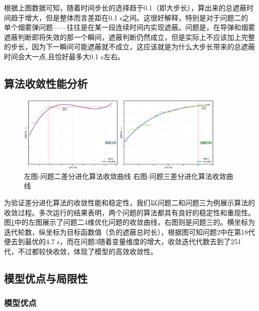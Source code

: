 \documentclass[fontset=SimSun]{ctexart}
\begin{document}
根据上图数据可知，随着时间步长的选择趋于0.1（即大步长），算出来的总遮蔽时间趋于增大，但是整体而言差距在0.1 s之间。这很好解释，特别是对于问题二的单个烟雾弹问题——往往是在某一段连续时间内实现遮蔽。问题是，在导弹和烟雾遮蔽判断即将失效的那一个瞬间，遮蔽判断仍然成立，但是实际上不应该加上完整的步长，因为下一瞬间可能遮蔽就不成立，这应该就是为什么大步长带来的总遮蔽时间会大一点,且恰好最多大0.1 s左右。

\subsection{算法收敛性能分析}

\begin{figure}[H]
    \centering
    \includegraphics[width=0.9\textwidth]{11.问题2和3的迭代收敛曲线.png}
    \caption{左图-问题二差分进化算法收敛曲线  右图-问题三差分进化算法收敛曲线}
    \label{fig:convergence_p2}
\end{figure}

为验证差分进化算法的收敛性能和稳定性，我们以问题二和问题三为例展示算法的收敛过程。多次运行的结果表明，两个问题的算法都具有良好的稳定性和重现性。图\ref{fig:convergence_p2}中的左图展示了问题二4维优化问题的收敛曲线，右图则是问题三的。横坐标为迭代轮数，纵坐标为目标函数值（负的遮蔽总时长），根据图可知问题2中在第18代便去到最优的4.7 s，而在问题3随着变量维度的增大，收敛迭代代数去到了251代，不过都较快收敛，体现了模型的高效收敛性。

\subsection{模型优点与局限性}

\subsubsection{模型优点}
\end{document}
